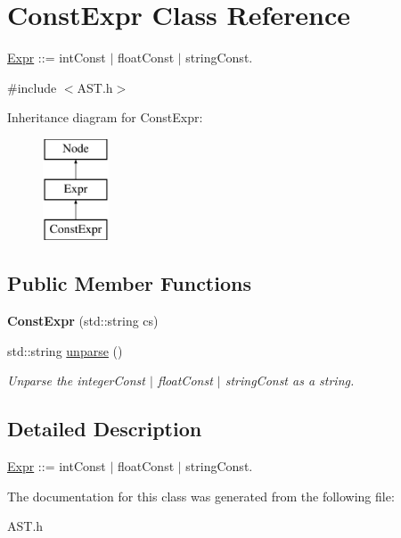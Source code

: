 \hypertarget{classConstExpr}{\section{Const\-Expr Class Reference}
\label{classConstExpr}
}


\hyperlink{classExpr}{Expr} \-:\-:= int\-Const $\vert$ float\-Const $\vert$ string\-Const.  




{\ttfamily \#include $<$A\-S\-T.\-h$>$}

Inheritance diagram for Const\-Expr\-:\begin{figure}[H]
\begin{center}
\leavevmode
\includegraphics[height=3.000000cm]{classConstExpr}
\end{center}
\end{figure}
\subsection*{Public Member Functions}
\begin{DoxyCompactItemize}
\item 
\hypertarget{classConstExpr_a043e22c04b62fc8087e3309292475ee2}{{\bfseries Const\-Expr} (std\-::string cs)}\label{classConstExpr_a043e22c04b62fc8087e3309292475ee2}

\item 
\hypertarget{classConstExpr_adc01f00000a931c663aedffdfcd132ad}{std\-::string \hyperlink{classConstExpr_adc01f00000a931c663aedffdfcd132ad}{unparse} ()}\label{classConstExpr_adc01f00000a931c663aedffdfcd132ad}

\begin{DoxyCompactList}\small\item\em Unparse the integer\-Const $\vert$ float\-Const $\vert$ string\-Const as a string. \end{DoxyCompactList}\end{DoxyCompactItemize}


\subsection{Detailed Description}
\hyperlink{classExpr}{Expr} \-:\-:= int\-Const $\vert$ float\-Const $\vert$ string\-Const. 

The documentation for this class was generated from the following file\-:\begin{DoxyCompactItemize}
\item 
A\-S\-T.\-h\end{DoxyCompactItemize}
